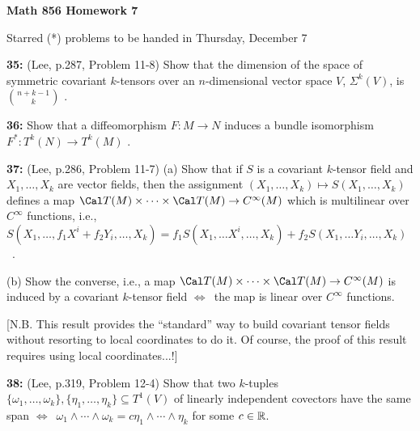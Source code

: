 
\nopagenumbers


\loadmsbm

\def\ctln{\centerline}
\def\ssk{\smallskip}
\def\msk{\medskip}
\def\bsk{\bigskip}
\def\nidt{\noindent}
\def\del{\partial}
\def\bbr{{\Bbb R}}

\def\ra{\rightarrow}
\def\lra{$\Leftrightarrow$}



\ctln{\bf Math 856 Homework 7}

\ssk

\ctln{Starred (*) problems to be handed in Thursday, December 7}

\bsk

\item{\bf 35:} (Lee, p.287, Problem 11-8) Show that the dimension of the 
space of symmetric covariant $k$-tensors over an $n$-dimensional vector space $V$,
$\Sigma^k(V)$, is $\displaystyle n+k-1\choose k$ .

\msk

\item{\bf 36:} Show that a diffeomorphism $F:M\ra N$ induces a bundle isomorphism
$F^*:T^k(N)\ra T^k(M)$ .

\msk

\item{\bf 37:} (Lee, p.286, Problem 11-7) (a) Show that if 
$S$ is a covariant $k$-tensor field and $X_1,\ldots ,X_k$ are
vector fields, then the assignment 
$(X_1,\ldots ,X_k)\mapsto S(X_1,\ldots ,X_k)$
defines a map ${\Cal T}(M)\times\cdots\times{\Cal T}(M)\ra C^\infty(M)$
which is multilinear over $C^\infty$ functions, i.e., 
$S(X_1,\ldots ,f_1X^i+f_2Y_i,\ldots ,X_k)=
f_1S(X_1,\ldots X^i,\ldots ,X_k)+f_2S(X_1,\ldots Y_i,\ldots ,X_k)$~.

\ssk

\item{}(b) Show the converse, i.e.,  a map 
${\Cal T}(M)\times\cdots\times{\Cal T}(M)\ra C^\infty(M)$ is induced 
by a covariant $k$-tensor field \lra\ the map is linear over $C^\infty$
functions.

\ssk

\item{}[N.B. This result provides the ``standard'' way to build covariant
tensor fields without resorting to local coordinates to do it. Of 
course, the proof of this result requires using local coordinates...!]


\msk

\item{\bf 38:} (Lee, p.319, Problem 12-4) Show that two $k$-tuples
$\{\omega_1,\ldots,\omega_k\},\{\eta_1,\ldots,\eta_k\}\subseteq T^1(V)$
of linearly independent covectors have the same span \lra\
$\omega_1\wedge\cdots\wedge\omega_k=c\eta_1\wedge\cdots\wedge\eta_k$
for some $c\in \bbr$.

